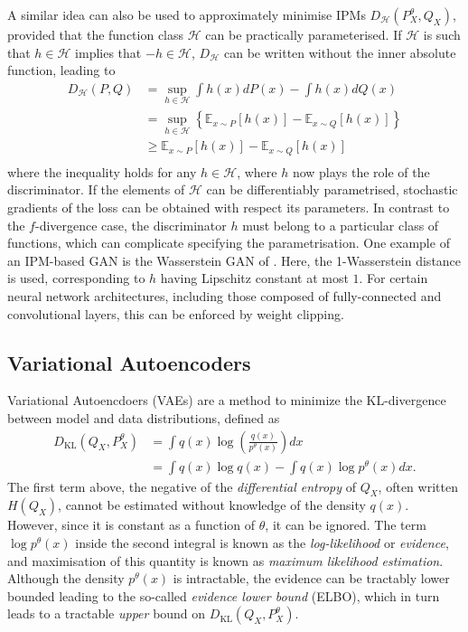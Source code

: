 A similar idea can also be used to approximately minimise IPMs $D_\mathcal{H}(P^\theta_X, Q_X)$, provided that the function class $\mathcal{H}$ can be practically parameterised.
If $\mathcal{H}$ is such that $h \in \mathcal{H}$ implies that $-h \in \mathcal{H}$, $D_\mathcal{H}$ can be written without the inner absolute function, leading to
%
\begin{align*}
D_{\mathcal{H}}(P, Q) &= \sup_{h\in\mathcal{H}} \int h(x) dP(x) - \int h(x) dQ(x) \\
&= \sup_{h\in\mathcal{H}} \left\{ \mathbb{E}_{x \sim P} \left[ h(x) \right]- \mathbb{E}_{x \sim Q} \left[ h(x) \right] \right\} \\
&\geq  \mathbb{E}_{x \sim P} \left[ h(x) \right]- \mathbb{E}_{x \sim Q} \left[ h(x) \right] \\
\end{align*}
%
where the inequality holds for any $h \in \mathcal{H}$, where $h$ now plays the role of the discriminator. 
If the elements of $\mathcal{H}$ can be differentiably parametrised, stochastic gradients of the loss can be obtained with respect its parameters.
In contrast to the $f$-divergence case, the discriminator $h$ must belong to a particular class of functions, which can complicate specifying the parametrisation.
One example of an IPM-based GAN is the Wasserstein GAN of \cite{AB17}. 
Here, the 1-Wasserstein distance is used, corresponding to $h$ having Lipschitz constant at most $1$. 
For certain neural network architectures, including those composed of fully-connected and convolutional layers, this can be enforced by weight clipping.

\subsection{Variational Autoencoders}

Variational Autoencdoers (VAEs) \citep{kingma2013auto, rezende2014stochastic} are a method to minimize the KL-divergence between model and data distributions, defined as
%
\begin{align*}
D_{\text{KL}}(Q_X, P^\theta_X) &= \int q(x) \log \left( \frac{q(x)}{p^\theta(x)} \right) dx \\
&= \int q(x) \log q(x) - \int q(x) \log p^\theta(x) dx.
\end{align*}
%
The first term above, the negative of the \emph{differential entropy} of $Q_X$, often written $H(Q_X)$, cannot be estimated without knowledge of the density $q(x)$.
However, since it is constant as a function of $\theta$, it can be ignored.
The term $\log p^\theta(x)$ inside the second integral is known as the \emph{log-likelihood} or \emph{evidence}, and maximisation of this quantity is known as \emph{maximum likelihood estimation}. 
Although the density $p^\theta(x)$ is intractable, the evidence can be tractably lower bounded leading to the so-called \emph{evidence lower bound} (ELBO), which in turn leads to a tractable \emph{upper} bound on $D_{\text{KL}}(Q_X, P^\theta_X)$. 

